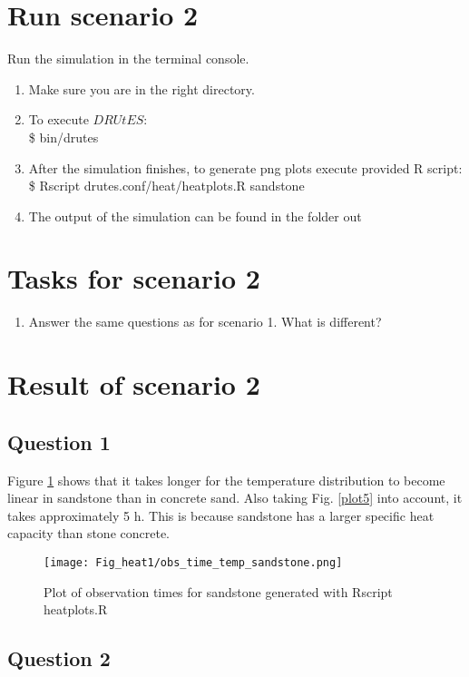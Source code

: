 \section*{Run scenario 2}
Run the simulation in the terminal console.
\begin{enumerate}
\item Make sure you are in the right directory. 
\item To execute $DRUtES$: \\
\$ bin/drutes
\item After the simulation finishes, to generate png plots execute provided R script: \\
\$ Rscript drutes.conf/heat/heatplots.R sandstone
\item The output of the simulation can be found in the folder out
\end{enumerate}

\section*{Tasks for scenario 2}

\begin{enumerate}
\item Answer the same questions as for scenario 1. What is different?
\end{enumerate}

\section*{Result of scenario 2}
\subsection*{Question 1}
Figure \ref{plot4} shows that it takes longer for the temperature distribution to become linear in sandstone than in concrete sand. Also taking Fig. \ref{plot5} into account, it takes approximately 5 h. This is because sandstone has a larger specific heat capacity than stone concrete.

\begin{figure}[!h]
\centering
\texttt{[image: Fig\_heat1/obs\_time\_temp\_sandstone.png]}
\caption{\label{plot4}Plot of observation times for sandstone generated with Rscript heatplots.R}
\end{figure}

\subsection*{Question 2}

